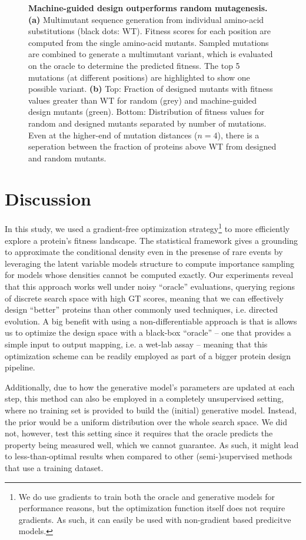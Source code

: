 \documentclass{article}
\begin{document}
\begin{figure}[htbp]
\begin{subfigure}[b]{.57\linewidth}
    \caption{}
  \end{subfigure}
  \caption{
    \textbf{Machine-guided design outperforms random mutagenesis. (a)}
    Multimutant sequence generation from individual amino-acid substitutions
    (black dots: WT). Fitness scores for each position are computed from the
    single amino-acid mutants. Sampled mutations are combined to generate a
    multimutant variant, which is evaluated on the oracle to determine the
    predicted fitness. The top 5 mutations (at different positions) are
    highlighted to show one possible variant. \textbf{(b)} Top: Fraction of
    designed mutants with fitness values greater than WT for random (grey) and
    machine-guided design mutants (green). Bottom: Distribution of fitness
    values for random and designed mutants separated by number of mutations.
    Even at the higher-end of mutation distances ($n=4$), there is a seperation
    between the fraction of proteins above WT from designed and random mutants.
  }
  \label{fig:random_vs_designed}
\end{figure}


\section{Discussion}
In this study, we used a gradient-free optimization strategy\footnote{We do use
gradients to train both the oracle and generative models for performance
reasons, but the optimization function itself does not require gradients. As
such, it can easily be used with non-gradient based predicitve models.} to more
efficiently explore a protein's fitness landscape. The statistical framework
gives a grounding to approximate the conditional density even in the presense of
rare events by leveraging the latent variable models structure to compute
importance sampling for models whose densities cannot be computed exactly. Our
experiments reveal that this approach works well under noisy ``oracle''
evaluations, querying regions of discrete search space with high GT scores,
meaning that we can effectively design ``better'' proteins than other commonly
used techniques, i.e. directed evolution. A big benefit with using a
non-differentiable approach is that is allows us to optimize the design space
with a black-box ``oracle'' -- one that provides a simple input to output
mapping, i.e. a wet-lab assay -- meaning that this optimization scheme can be
readily employed as part of a bigger protein design pipeline.

Additionally, due to how the generative model's parameters are updated at each
step, this method can also be employed in a completely unsupervised setting,
where no training set is provided to build the (initial) generative model.
Instead, the prior would be a uniform distribution over the whole search space.
We did not, however, test this setting since it requires that the oracle
predicts the property being measured well, which we cannot guarantee. As such,
it might lead to less-than-optimal results when compared to other
(semi-)supervised methods that use a training dataset.
\end{document}

